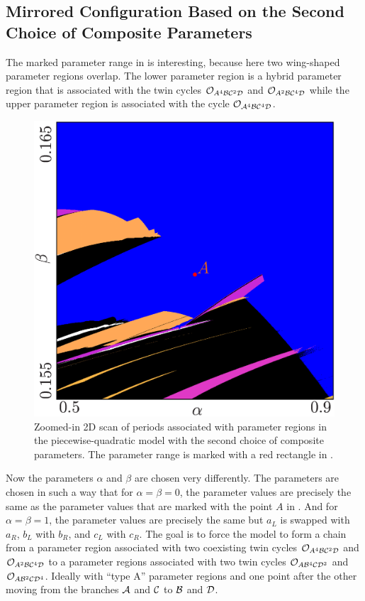 \subsection{Mirrored Configuration Based on the Second Choice of Composite Parameters}

The marked parameter range in  is interesting, because here two wing-shaped parameter regions overlap.
The lower parameter region is a hybrid parameter region that is associated with the twin cycles $\mathcal{O}_{A^4\mathcal{B}\mathcal{C}^2\mathcal{D}}$ and $\mathcal{O}_{A^2\mathcal{B}\mathcal{C}^4\mathcal{D}}$ while the upper parameter region is associated with the cycle $\mathcal{O}_{\mathcal{A}^4\mathcal{B}\mathcal{C}^4\mathcal{D}}$.

\begin{figure}
	\centering
	\includegraphics[width=.4 \textwidth]{../Figures/A/A.5/result.png}
	\caption[Zoomed-in 2D scan of periods associated with parameter regions in the piecewise-quadratic model with the second choice of composite parameters]{
		Zoomed-in 2D scan of periods associated with parameter regions in the piecewise-quadratic model with the second choice of composite parameters.
		The parameter range is marked with a red rectangle in .
	}
	\label{fig:app.model.quad.second.zoomed}
\end{figure}

Now the parameters $\alpha$ and $\beta$ are chosen very differently.
The parameters are chosen in such a way that for $\alpha = \beta = 0$, the parameter values are precisely the same as the parameter values that are marked with the point $A$ in .
And for $\alpha = \beta = 1$, the parameter values are precisely the same but $a_L$ is swapped with $a_R$, $b_L$ with $b_R$, and $c_L$ with $c_R$.
The goal is to force the model to form a chain from a parameter region associated with two coexisting twin cycles $\mathcal{O}_{A^4\mathcal{B}\mathcal{C}^2\mathcal{D}}$ and $\mathcal{O}_{A^2\mathcal{B}\mathcal{C}^4\mathcal{D}}$ to a parameter regions associated with two twin cycles $\mathcal{O}_{A\mathcal{B}^4\mathcal{C}\mathcal{D}^2}$ and $\mathcal{O}_{A\mathcal{B}^2\mathcal{C}\mathcal{D}^4}$.
Ideally with ``type A'' parameter regions and one point after the other moving from the branches $\mathcal{A}$ and $\mathcal{C}$ to $\mathcal{B}$ and $\mathcal{D}$.

